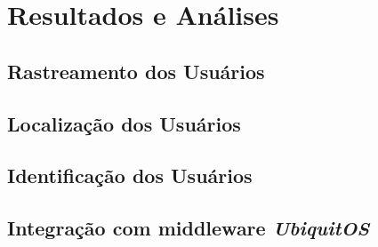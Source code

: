 \chapter{Resultados e Análises}




\section{Rastreamento dos Usuários}

\section{Localização dos Usuários}

\section{Identificação dos Usuários}

\section{Integração com middleware \textit{UbiquitOS}}

